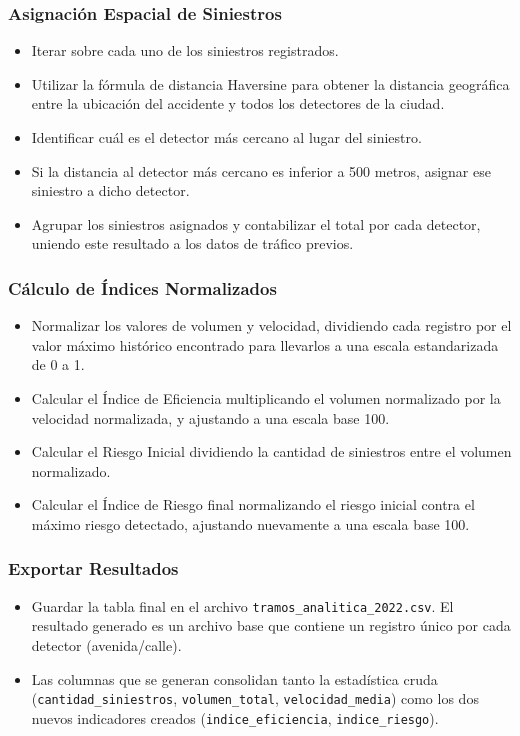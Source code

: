 \subsubsection*{Asignación Espacial de Siniestros}
\begin{itemize}[noitemsep]
    \item Iterar sobre cada uno de los siniestros registrados.
    \item Utilizar la fórmula de distancia Haversine para obtener la 
        distancia geográfica entre la ubicación del accidente y todos 
        los detectores de la ciudad.
    \item Identificar cuál es el detector más cercano al lugar del siniestro.
    \item Si la distancia al detector más cercano es inferior a 500 metros, 
        asignar ese siniestro a dicho detector.
    \item Agrupar los siniestros asignados y contabilizar el total por cada 
        detector, uniendo este resultado a los datos de tráfico previos.
\end{itemize}

\subsubsection*{Cálculo de Índices Normalizados}
\begin{itemize}[noitemsep]
    \item Normalizar los valores de volumen y velocidad, dividiendo cada 
        registro por el valor máximo histórico encontrado para llevarlos a una 
        escala estandarizada de 0 a 1.
    \item Calcular el Índice de Eficiencia multiplicando el volumen 
        normalizado por la velocidad normalizada, y ajustando a una escala 
        base 100.
    \item Calcular el Riesgo Inicial dividiendo la cantidad de siniestros 
        entre el volumen normalizado.
    \item Calcular el Índice de Riesgo final normalizando el riesgo inicial 
        contra el máximo riesgo detectado, ajustando nuevamente a una escala 
        base 100.
\end{itemize}

\subsubsection*{Exportar Resultados}
\begin{itemize}[noitemsep]
    \item Guardar la tabla final en el archivo 
        \texttt{tramos\_analitica\_2022.csv}. 
        El resultado generado es un archivo base que contiene un registro 
        único por cada detector (avenida/calle).
    \item Las columnas que se generan consolidan tanto la estadística cruda 
        (\texttt{cantidad\_siniestros}, \texttt{volumen\_total}, 
        \texttt{velocidad\_media}) como los dos nuevos indicadores creados 
        (\texttt{indice\_eficiencia}, \texttt{indice\_riesgo}).
\end{itemize}


